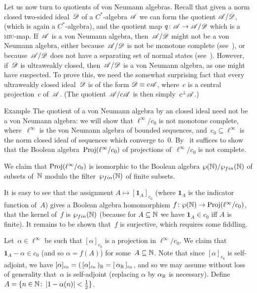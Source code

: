\documentclass[main]{subfiles}
\begin{document}
\begin{parsec}%
\begin{point}%
Let us now turn to quotients of von Neumann algebras.
Recall that given a norm closed two-sided ideal~$\mathscr{D}$
of a $C^*$-algebra $\mathscr{A}$
we can form the quotient $\mathscr{A}/\mathscr{D}$,
(which is again a $C^*$-algebra),
and the quotient map $q\colon \mathscr{A}\to \mathscr{A}/\mathscr{D}$
which is a \textsc{miu}-map.
If~$\mathscr{A}$ is a von Neumann algebra,
then~$\mathscr{A}/\mathscr{D}$ might not be a von Neumann algebra,
either because~$\mathscr{A}/\mathscr{D}$ is not be monotone complete 
(see~),
or because~$\mathscr{A}/\mathscr{D}$ does not have a separating set of normal states
(see~\TODO{}).
However, if~$\mathscr{D}$ is ultraweakly closed,
then~$\mathscr{A}/\mathscr{D}$ is a von Neumann algebra,
as one might have suspected.
To prove this,
we need the somewhat surprising
fact that every ultraweakly closed
ideal~$\mathscr{D}$ is of the form $\mathscr{D}\equiv c\mathscr{A}$,
where~$c$ is a central projection~$c$ of~$\mathscr{A}$.
(The quotient~$\mathscr{A}/c\mathscr{A}$ is then simply~$c^\perp\mathscr{A}$.)
\end{point}
\begin{point}{Example}%
The quotient of a von Neumann algebra
by an closed ideal
need not be a von Neumann algebra:
we will show that $\ell^\infty/c_0$
is not monotone complete,
where~$\ell^\infty$ is the von Neumann algebra
of bounded sequences,
and~$c_0\subseteq \ell^\infty$
is the norm closed ideal of
sequences which converge to~$0$.
By~
it suffices to show that the Boolean algebra~$\operatorname{Proj}(\ell^\infty/c_0)$
of projections of~$\ell^\infty/c_0$ is not complete.
\begin{point}%
We claim that $\operatorname{Proj}(\ell^\infty/c_0)$
is isomorphic to the Boolean algebra
 $\wp(\mathbb{N})/\wp_{fin}(\mathbb{N})$
of subsets of~$\mathbb{N}$ modulo 
the filter~$\wp_{fin}(\mathbb{N})$ of finite subsets.

It is easy to see that the assignment $A\mapsto [\mathbf{1}_A]_{c_0}$
(where $\mathbf{1}_A$ is the indicator function of~$A$)
gives a Boolean algebra homomorphism 
$f\colon \wp(\mathbb{N})\to \operatorname{Proj}(\ell^\infty/c_0)$,
that the kernel of~$f$
is $\wp_{fin}(\mathbb{N})$
(because for $A\subseteq \mathbb{N}$
we have $\mathbf{1}_A\in c_0$ iff $A$ is finite).
It remains to be shown that~$f$ is surjective,
which requires some fiddling.

Let~$\alpha\in \ell^\infty$
be
such that $[\alpha]_{c_0}$ is a projection in $\ell^\infty/c_0$.
We claim that
$\mathbf{1}_A - \alpha \in c_0$ (and so $\alpha=f(A)$)
for some~$A\subseteq \mathbb{N}$.
Note that since $[\alpha]_{c_0}$ is self-adjoint,
we have $[\alpha]_{c_0}=(\,[\alpha]_{c_0}\,)_{\mathbb{R}} = [\,\alpha_{\mathbb{R}}\,]_{c_0}$,
and so we may assume without loss of generality
that~$\alpha$ is self-adjoint
(replacing $\alpha$ by $\alpha_{\mathbb{R}}$ is necessary).
Define $A=\{n\in\mathbb{N}\colon \left|1-\alpha(n)\right|<\frac{1}{2}\}$.


\end{point}
\end{point}
\end{parsec}
\end{document}
